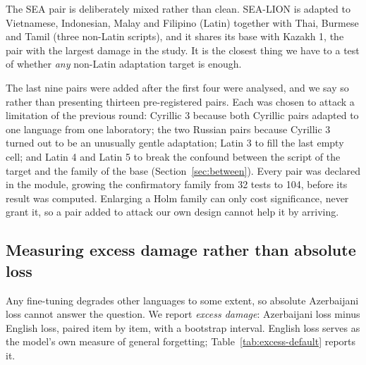 \documentclass[final]{clv2025}
\begin{document}
The SEA pair is deliberately mixed rather than clean. SEA-LION is adapted to
Vietnamese, Indonesian, Malay and Filipino (Latin) together with Thai, Burmese
and Tamil (three non-Latin scripts), and it shares its base with Kazakh 1, the
pair with the largest damage in the study. It is the closest thing we have to a
test of whether \emph{any} non-Latin adaptation target is enough.

The last nine pairs were added after the first four were analysed, and we say
so rather than presenting thirteen pre-registered pairs. Each was chosen to
attack a limitation of the previous round: Cyrillic 3 because both Cyrillic
pairs adapted to one language from one laboratory; the two Russian pairs
because Cyrillic 3 turned out to be an unusually gentle adaptation; Latin 3 to
fill the last empty cell; and Latin 4 and Latin 5 to break the confound between
the script of the target and the family of the base
(Section~\ref{sec:between}). Every pair was declared in the module, growing the
confirmatory family from 32 tests to 104, before its result was computed.
Enlarging a Holm family can only cost significance, never grant it, so a pair
added to attack our own design cannot help it by arriving.

\subsection{Measuring excess damage rather than absolute loss}

Any fine-tuning degrades other languages to some extent, so absolute
Azerbaijani loss cannot answer the question. We report \emph{excess damage}:
Azerbaijani loss minus English loss, paired item by item, with a bootstrap
interval. English loss serves as the model's own measure of general
forgetting; Table~\ref{tab:excess-default} reports it.
\end{document}
